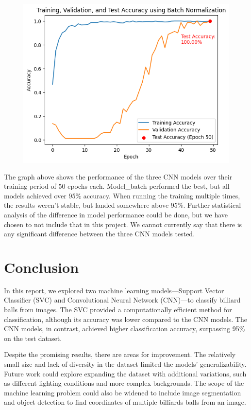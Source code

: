 \documentclass{article}
\begin{document}
\begin{figure}[h]
\begin{minipage}{0.32\textwidth}
        \includegraphics[width=\textwidth]{images/batch_cnn_accuracy.png}
    \end{minipage}
\end{figure}

The graph above shows the performance of the three CNN models over their training period of 50 epochs each. Model\_batch performed the best, but all models achieved over 95\% accuracy. When running the training multiple times, the results weren't stable, but landed somewhere above 95\%. Further statistical analysis of the difference in model performance could be done, but we have chosen to not include that in this project. We cannot currently say that there is any significant difference between the three CNN models tested.

\section{Conclusion}
\label{sec:conclusion}
In this report, we explored two machine learning models—Support Vector Classifier (SVC) and Convolutional Neural Network (CNN)—to classify billiard balls from images. The SVC provided a computationally efficient method for classification, although its accuracy was lower compared to the CNN models. The CNN models, in contrast, achieved higher classification accuracy, surpassing 95\% on the test dataset.

Despite the promising results, there are areas for improvement. The relatively small size and lack of diversity in the dataset limited the models’ generalizability. Future work could explore expanding the dataset with additional variations, such as different lighting conditions and more complex backgrounds. The scope of the machine learning problem could also be widened to include image segmentation and object detection to find coordinates of multiple billiards balls from an image.
\end{document}
